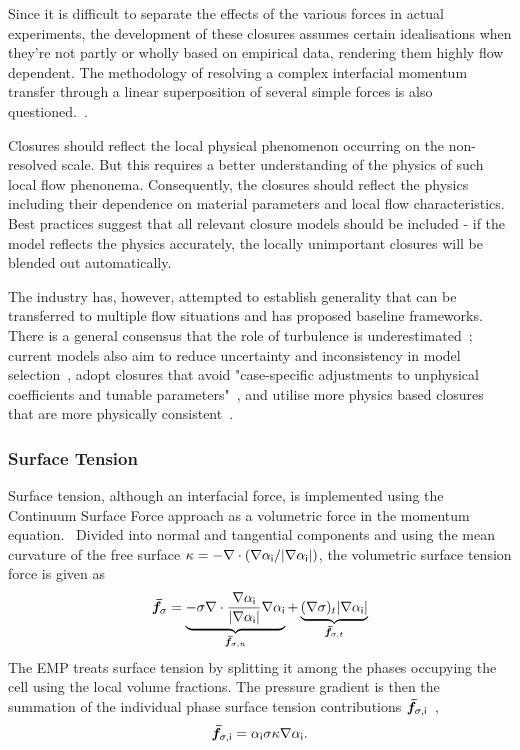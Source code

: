  Since it is 
 difficult to separate the effects of the various forces in actual experiments,
 the development of these closures assumes certain idealisations when they're not
 partly or wholly based on empirical data, rendering them highly flow 
 dependent. The methodology of resolving a 
 complex interfacial momentum transfer through a linear superposition 
 of several simple forces is also questioned.~\cite{sugrueRobustMomentumClosure}. 

 Closures should reflect the local physical phenomenon occurring on the non-resolved scale. 
 But this requires a better understanding of the physics of such local flow phenonema. 
 Consequently, the closures should reflect the physics including their dependence 
 on material parameters and local flow characteristics. Best practices suggest that all relevant closure models should be included 
 - if the model reflects the physics accurately, 
 the locally unimportant closures will be blended out automatically.

The industry has, however, attempted to establish generality that can be transferred 
 to multiple flow situations and has proposed baseline frameworks. There is a general consensus
 that the role of turbulence is underestimated~\cite{colomboBenchmarkingCFDModelling};
 current models also aim to reduce 
 uncertainty and inconsistency in model selection~\cite{colomboBenchmarkingCFDModelling}, 
 adopt closures that avoid "case-specific adjustments to unphysical coefficients and 
 tunable parameters"~\cite{sugrueRobustMomentumClosure}, and utilise more
 physics based closures that are more physically consistent~\cite{liaoEulerianModellingTurbulent2018,colomboBenchmarkingCFDModelling}.

 \subsubsection{Surface Tension}
Surface tension, although an interfacial force, is implemented using the 
 Continuum Surface Force approach as a volumetric force in the momentum equation.~\cite{star-ccm+}
 Divided into normal and tangential components and using the mean 
 curvature of the free surface 
 \(\kappa = - \nabla \cdot \left(\nabla \alpha_{\mathsf {i}}/|\nabla \alpha_{\mathsf {i}}|\right)\),
 the volumetric surface tension force is given as 
 \begin{equation}
   \bm{\bar{f}}_{\sigma} = \underbrace{-\sigma \nabla \cdot \frac{\nabla \alpha_{\mathsf {i}}}{|\nabla \alpha_{\mathsf {i}}|} \nabla \alpha_{\mathsf {i}}}_{\bm{\bar{f}}_{\sigma,n}}
    + \underbrace{(\nabla \sigma)_{t}|\nabla \alpha_{\mathsf {i}}|}_{\bm{\bar{f}}_{\sigma,t}}
 \end{equation}
 The EMP treats surface tension by splitting it among the phases occupying
 the cell using the local volume fractions. The pressure gradient
 is then the summation of the 
 individual phase surface tension contributions \(\bm{\bar{f}}_{\sigma, \mathsf {i}}\)~\cite{gadaLargeScaleInterface2017,star-ccm+},
 \begin{equation}
   \bm{\bar{f}}_{\sigma, \mathsf {i}} = \alpha_{\mathsf {i}} \sigma \kappa \nabla \alpha_{\mathsf {i}}.
 \end{equation}

